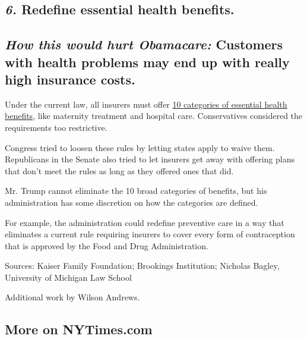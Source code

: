 \hypertarget{6-redefine-essential-health-benefits}{%
\subsection{\texorpdfstring{\emph{\textbf{6.}} \textbf{Redefine
essential health
benefits.}}{6. Redefine essential health benefits.}}\label{6-redefine-essential-health-benefits}}

\hypertarget{how-this-would-hurt-obamacare-customers-with-health-problems-may-end-up-with-really-high-insurance-costs}{%
\subsection{\texorpdfstring{\emph{How this would hurt Obamacare:}
Customers with health problems may end up with really high insurance
costs.}{How this would hurt Obamacare: Customers with health problems may end up with really high insurance costs.}}\label{how-this-would-hurt-obamacare-customers-with-health-problems-may-end-up-with-really-high-insurance-costs}}

Under the current law, all insurers must offer
\href{https://www.nytimes.com/interactive/2017/03/24/us/essential-health-benefits.html}{10
categories of essential health benefits}, like maternity treatment and
hospital care. Conservatives considered the requirements too
restrictive.

Congress tried to loosen these rules by letting states apply to waive
them. Republicans in the Senate also tried to let insurers get away with
offering plans that don't meet the rules as long as they offered ones
that did.

Mr. Trump cannot eliminate the 10 broad categories of benefits, but his
administration has some discretion on how the categories are defined.

For example, the administration could redefine preventive care in a way
that eliminates a current rule requiring insurers to cover every form of
contraception that is approved by the Food and Drug Administration.

Sources: Kaiser Family Foundation; Brookings Institution; Nicholas
Bagley, University of Michigan Law School

Additional work by Wilson Andrews.

\hypertarget{more-on-nytimescom}{%
\subsection{More on NYTimes.com}\label{more-on-nytimescom}}

